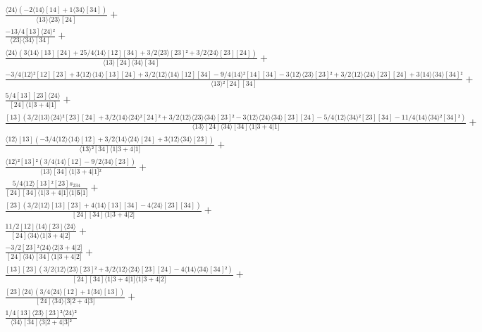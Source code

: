 \documentclass[varwidth, border=5pt]{standalone}
\begin{document}
\begin{my}
$\begin{gathered}
\scriptscriptstyle\frac{⟨24⟩(-2⟨14⟩[14]+1⟨34⟩[34])}{⟨13⟩⟨23⟩[24]} +\\
\scriptscriptstyle\frac{-13/4[13]⟨24⟩²}{⟨23⟩⟨34⟩[34]} +\\
\scriptscriptstyle\frac{⟨24⟩(3⟨14⟩[13][24]+25/4⟨14⟩[12][34]+3/2⟨23⟩[23]²+3/2⟨24⟩[23][24])}{⟨13⟩[24]⟨34⟩[34]} +\\
\scriptscriptstyle\frac{-3/4⟨12⟩²[12][23]+3⟨12⟩⟨14⟩[13][24]+3/2⟨12⟩⟨14⟩[12][34]-9/4⟨14⟩²[14][34]-3⟨12⟩⟨23⟩[23]²+3/2⟨12⟩⟨24⟩[23][24]+3⟨14⟩⟨34⟩[34]²}{⟨13⟩²[24][34]} +\\
\scriptscriptstyle\frac{5/4[13][23]⟨24⟩}{[24]⟨1|3+4|1]} +\\
\scriptscriptstyle\frac{[13](3/2⟨13⟩⟨24⟩²[23][24]+3/2⟨14⟩⟨24⟩²[24]²+3/2⟨12⟩⟨23⟩⟨34⟩[23]²-3⟨12⟩⟨24⟩⟨34⟩[23][24]-5/4⟨12⟩⟨34⟩²[23][34]-11/4⟨14⟩⟨34⟩²[34]²)}{⟨13⟩[24]⟨34⟩[34]⟨1|3+4|1]} +\\
\scriptscriptstyle\frac{⟨12⟩[13](-3/4⟨12⟩⟨14⟩[12]+3/2⟨14⟩⟨24⟩[24]+3⟨12⟩⟨34⟩[23])}{⟨13⟩²[34]⟨1|3+4|1]} +\\
\scriptscriptstyle\frac{⟨12⟩²[13]²(3/4⟨14⟩[12]-9/2⟨34⟩[23])}{⟨13⟩[34]⟨1|3+4|1]²} +\\
\scriptscriptstyle\frac{5/4⟨12⟩[13]²[23]s_{234}}{[24][34]⟨1|3+4|1]⟨1|𝟓|1]} +\\
\scriptscriptstyle\frac{[23](3/2⟨12⟩[13][23]+4⟨14⟩[13][34]-4⟨24⟩[23][34])}{[24][34]⟨1|3+4|2]} +\\
\scriptscriptstyle\frac{11/2[12]⟨14⟩[23]⟨24⟩}{[24]⟨34⟩⟨1|3+4|2]} +\\
\scriptscriptstyle\frac{-3/2[23]²⟨24⟩⟨2|3+4|2]}{[24]⟨34⟩[34]⟨1|3+4|2]} +\\
\scriptscriptstyle\frac{[13][23](3/2⟨12⟩⟨23⟩[23]²+3/2⟨12⟩⟨24⟩[23][24]-4⟨14⟩⟨34⟩[34]²)}{[24][34]⟨1|3+4|1]⟨1|3+4|2]} +\\
\scriptscriptstyle\frac{[23]⟨24⟩(3/4⟨24⟩[12]+1⟨34⟩[13])}{[24]⟨34⟩⟨3|2+4|3]} +\\
\scriptscriptstyle\frac{1/4[13]⟨23⟩[23]²⟨24⟩²}{⟨34⟩[34]⟨3|2+4|3]²} \phantom{+}
\end{gathered}$
\end{my}
\end{document}
